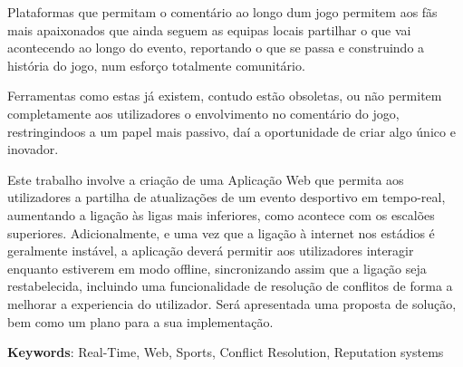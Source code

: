 Plataformas que permitam o comentário ao longo dum jogo permitem aos fãs mais apaixonados que ainda seguem as equipas locais partilhar o que vai acontecendo ao longo do evento, reportando o que se passa e construindo a história do jogo, num esforço totalmente comunitário. 

Ferramentas como estas já existem, contudo estão obsoletas, ou não permitem completamente aos utilizadores o envolvimento no comentário do jogo, restringindoos a um papel mais passivo, daí a oportunidade de criar algo único e inovador. 

Este trabalho involve a criação de uma Aplicação Web que permita aos utilizadores a partilha de atualizações de um evento desportivo em tempo-real, aumentando a ligação às ligas mais inferiores, como acontece com os escalões superiores. Adicionalmente, e uma vez que a ligação à internet nos estádios é geralmente instável, a aplicação deverá permitir aos utilizadores interagir enquanto estiverem em modo offline, sincronizando assim que a ligação seja restabelecida, incluindo uma funcionalidade de resolução de conflitos de forma a melhorar a experiencia do utilizador. Será apresentada uma proposta de solução, bem como um plano para a sua implementação.


\vspace*{10mm}\noindent
\textbf{Keywords}: Real-Time, Web, Sports, Conflict Resolution, Reputation systems
